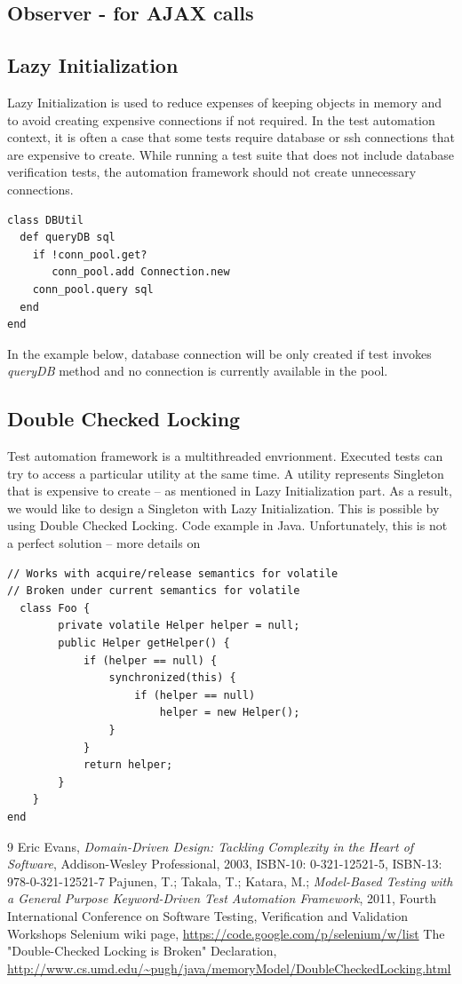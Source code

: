 \documentclass[12pt,twoside]{article}
\begin{document}
\subsection{Observer - for AJAX calls}

\subsection{Lazy Initialization}
Lazy Initialization is used to reduce expenses of keeping objects in memory and to avoid creating expensive connections if not required. In the test automation context, it is often a case that some tests require database or ssh connections that are expensive to create. While running a test suite that does not include database verification tests, the automation framework should not create unnecessary connections. 
\begin{verbatim}
class DBUtil
  def queryDB sql
    if !conn_pool.get?
       conn_pool.add Connection.new
    conn_pool.query sql
  end
end
\end{verbatim}
In the example below, database connection will be only created if test invokes \emph{queryDB} method and no connection is currently available in the pool.

\subsection{Double Checked Locking}
Test automation framework is a multithreaded envrionment. Executed tests can try to access a particular utility at the same time. A utility represents Singleton that is expensive to create -- as mentioned in Lazy Initialization part. As a result, we would like to design a Singleton with Lazy Initialization. This is possible by using Double Checked Locking.
Code example in Java. Unfortunately, this is not a perfect solution -- more details on~\cite{ref:4.1}
\begin{verbatim}
// Works with acquire/release semantics for volatile
// Broken under current semantics for volatile
  class Foo {
        private volatile Helper helper = null;
        public Helper getHelper() {
            if (helper == null) {
                synchronized(this) {
                    if (helper == null)
                        helper = new Helper();
                }
            }
            return helper;
        }
    }
end
\end{verbatim}

\begin{thebibliography} {9}
 Eric Evans, {\sl Domain-Driven Design: Tackling Complexity in the Heart of Software}, Addison-Wesley Professional, 2003, ISBN-10: 0-321-12521-5, ISBN-13: 978-0-321-12521-7
 Pajunen, T.; Takala, T.; Katara, M.; {\sl Model-Based Testing with a General Purpose Keyword-Driven Test Automation Framework}, 2011, Fourth International Conference on Software Testing, Verification and Validation Workshops
 Selenium wiki page, \url{https://code.google.com/p/selenium/w/list}
 The "Double-Checked Locking is Broken" Declaration, \url{http://www.cs.umd.edu/~pugh/java/memoryModel/DoubleCheckedLocking.html}
\end{thebibliography}
\end{document}
